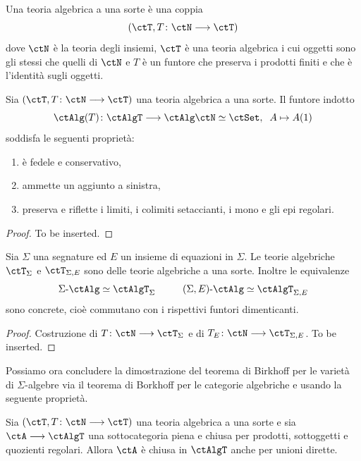 \begin{definition}\label{def_th_alg_unasorte}
 Una teoria algebrica a una sorte è una coppia
 \[(\ctT, T \colon \ctN \fun \ctT)\]
 dove \(\ctN\) è la teoria degli insiemi, \(\ctT\) è una teoria algebrica i cui oggetti sono gli stessi che quelli di \(\ctN\) e \(T\)
 è un funtore che preserva i prodotti finiti e che è l'identità sugli oggetti.
\end{definition}

\begin{proposition}\label{prop_funt_ind_unasorte}
 Sia \((\ctT, T \colon \ctN \fun \ctT)\) una teoria algebrica a una sorte. Il funtore indotto
 \[\ctAlg(T) \colon \ctAlgT \fun \ctAlg\ctN \simeq \ctSet , \;\; A \mapsto A(1)\]
 soddisfa le seguenti proprietà:
 \begin{enumerate}
  \item è fedele e conservativo,
  \item ammette un aggiunto a sinistra,
  \item preserva e riflette i limiti, i colimiti setaccianti, i mono e gli epi regolari.
 \end{enumerate}
\end{proposition}

\begin{proof}
 To be inserted.
\end{proof}

\begin{proposition}\label{prop_confr_sigma_tunasorte}
 Sia \(\Sigma\) una segnature ed \(E\) un insieme di equazioni in \(\Sigma\). Le teorie algebriche \(\ctT_{\Sigma}\) e \(\ctT_{\Sigma,E}\)
 sono delle teorie algebriche a una sorte. Inoltre le equivalenze
 \[\ctSAlg \simeq \ctAlgT_{\Sigma} \;\;\;\;\;\;\;\;\;\; \ctSEAlg \simeq \ctAlgT_{\Sigma,E}\]
 sono concrete, cioè commutano con i rispettivi funtori dimenticanti.
\end{proposition}

\begin{proof}
 Costruzione di \(T \colon \ctN \fun \ctT_{\Sigma}\) e di \(T_E \colon \ctN \fun \ctT_{\Sigma,E}\). To be inserted.
\end{proof}

Possiamo ora concludere la dimostrazione del teorema di Birkhoff per le varietà di \(\Sigma\)-algebre via il teorema di Borkhoff
per le categorie algebriche e usando la seguente proprietà.

\begin{proposition}\label{prop_rid_Birkhoff}
 Sia \((\ctT, T \colon \ctN \fun \ctT)\) una teoria algebrica a una sorte e sia \(\ctA \fun \ctAlgT\) una sottocategoria piena e chiusa
 per prodotti, sottoggetti e quozienti regolari. Allora \(\ctA\) è chiusa in \(\ctAlgT\) anche per unioni dirette.
\end{proposition}


